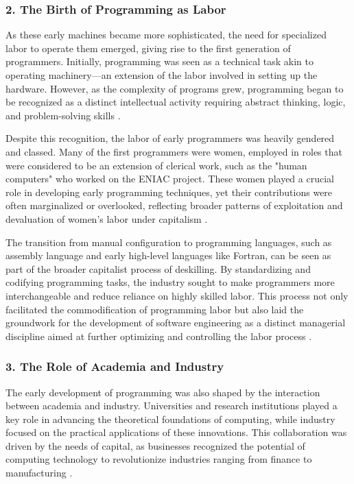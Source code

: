 \begin{refsection}
\begin{multicols}{2}
{\subsubsection*{2. The Birth of Programming as Labor}

As these early machines became more sophisticated, the need for specialized labor to operate them emerged, giving rise to the first generation of programmers. Initially, programming was seen as a technical task akin to operating machinery—an extension of the labor involved in setting up the hardware. However, as the complexity of programs grew, programming began to be recognized as a distinct intellectual activity requiring abstract thinking, logic, and problem-solving skills \cite{haigh2014crisis}.

Despite this recognition, the labor of early programmers was heavily gendered and classed. Many of the first programmers were women, employed in roles that were considered to be an extension of clerical work, such as the "human computers" who worked on the ENIAC project. These women played a crucial role in developing early programming techniques, yet their contributions were often marginalized or overlooked, reflecting broader patterns of exploitation and devaluation of women's labor under capitalism \cite{abbate2012recoding}.

The transition from manual configuration to programming languages, such as assembly language and early high-level languages like Fortran, can be seen as part of the broader capitalist process of deskilling. By standardizing and codifying programming tasks, the industry sought to make programmers more interchangeable and reduce reliance on highly skilled labor. This process not only facilitated the commodification of programming labor but also laid the groundwork for the development of software engineering as a distinct managerial discipline aimed at further optimizing and controlling the labor process \cite{braverman1974labor}.

\subsubsection*{3. The Role of Academia and Industry}

The early development of programming was also shaped by the interaction between academia and industry. Universities and research institutions played a key role in advancing the theoretical foundations of computing, while industry focused on the practical applications of these innovations. This collaboration was driven by the needs of capital, as businesses recognized the potential of computing technology to revolutionize industries ranging from finance to manufacturing \cite{haigh2014crisis}.

}
\end{multicols}
\end{refsection}
